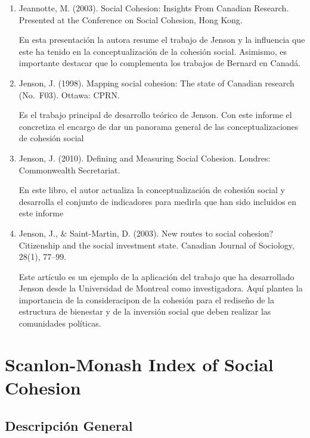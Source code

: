 \documentclass[
  12pt,
]{book}
\begin{document}
\begin{enumerate}
\def\labelenumi{\arabic{enumi}.}
\item
  Jeannotte, M. (2003). Social Cohesion: Insights From Canadian
  Research. Presented at the Conference on Social Cohesion, Hong Kong.

  En esta presentación la autora resume el trabajo de Jenson y la
  influencia que este ha tenido en la conceptualización de la cohesión
  social. Asimismo, es importante destacar que lo complementa los trabajos
  de Bernard en Canadá.
\item
  Jenson, J. (1998). Mapping social cohesion: The state of Canadian
  research (No.~F03). Ottawa: CPRN.

  Es el trabajo principal de desarrollo teórico de Jenson. Con este informe el concretiza el encargo de dar un panorama general de las conceptualizaciones de cohesión social
\item
  Jenson, J. (2010). Defining and Measuring Social Cohesion. Londres:
  Commonwealth Secretariat.

  En este libro, el autor actualiza la conceptualización de cohesión social y desarrolla el conjunto de indicadores para medirla que han sido incluidos en este informe
\item
  Jenson, J., \& Saint-Martin, D. (2003). New routes to social
  cohesion? Citizenship and the social investment state. Canadian
  Journal of Sociology, 28(1), 77--99.

  Este artículo es un ejemplo de la aplicación del trabajo que ha desarrollado Jenson desde la Universidad de Montreal como investigadora. Aquí plantea la importancia de la consideracipon de la cohesión para el rediseño de la estructura de bienestar y de la inversión social que deben realizar las comunidades políticas.
\end{enumerate}

\hypertarget{scanlon-monash-index-of-social-cohesion}{%
\chapter{Scanlon-Monash Index of Social Cohesion}\label{scanlon-monash-index-of-social-cohesion}}

\hypertarget{descripciuxf3n-general-1}{%
\section{Descripción General}\label{descripciuxf3n-general-1}}
\end{document}
